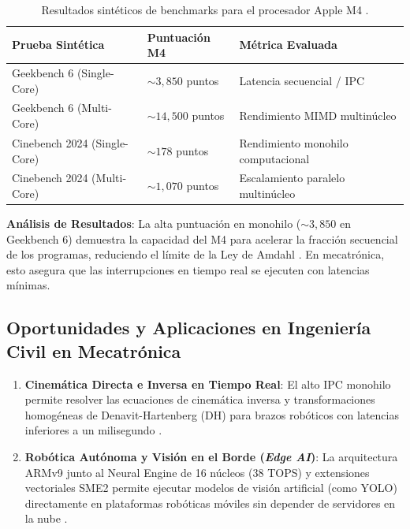\documentclass[12pt,a4paper]{article}
\begin{document}
\begin{table}[H]
\centering
\caption{Resultados sintéticos de benchmarks para el procesador Apple M4 \cite{apple_m4}.}
\label{tab:benchmarks_m4}
\small
\begin{tabular}{L{4.5cm} C{3.5cm} C{4.5cm}}
\toprule
\textbf{Prueba Sintética} & \textbf{Puntuación M4} & \textbf{Métrica Evaluada} \\
\midrule
Geekbench 6 (Single-Core) & $\sim 3,850$ puntos & Latencia secuencial / IPC \\
Geekbench 6 (Multi-Core) & $\sim 14,500$ puntos & Rendimiento MIMD multinúcleo \\
Cinebench 2024 (Single-Core) & $\sim 178$ puntos & Rendimiento monohilo computacional \\
Cinebench 2024 (Multi-Core) & $\sim 1,070$ puntos & Escalamiento paralelo multinúcleo \\
\bottomrule
\end{tabular}
\end{table}

\textbf{Análisis de Resultados}: La alta puntuación en monohilo ($\sim 3,850$ en Geekbench 6) demuestra la capacidad del M4 para acelerar la fracción secuencial de los programas, reduciendo el límite de la Ley de Amdahl \cite{amdahl}. En mecatrónica, esto asegura que las interrupciones en tiempo real se ejecuten con latencias mínimas.

\subsection{Oportunidades y Aplicaciones en Ingeniería Civil en Mecatrónica}
\begin{enumerate}[leftmargin=*]
    \item \textbf{Cinemática Directa e Inversa en Tiempo Real}: El alto IPC monohilo permite resolver las ecuaciones de cinemática inversa y transformaciones homogéneas de Denavit-Hartenberg (DH) para brazos robóticos con latencias inferiores a un milisegundo \cite{patterson, apple_m4}.
    \item \textbf{Robótica Autónoma y Visión en el Borde (\textit{Edge AI})}: La arquitectura ARMv9 junto al Neural Engine de 16 núcleos (38 TOPS) y extensiones vectoriales SME2 permite ejecutar modelos de visión artificial (como YOLO) directamente en plataformas robóticas móviles sin depender de servidores en la nube \cite{armv9, apple_m4}.
\end{enumerate}


\end{document}
